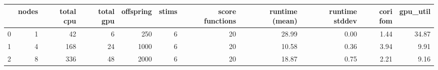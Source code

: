 \begin{tabular}{lrrrrrrrrrr}
\toprule
{} &  nodes &  total cpu &  total gpu &  offspring &  stims &  score functions & runtime (mean) & runtime stddev & cori fom & gpu\_util \\
\midrule
0 &      1 &         42 &          6 &        250 &      6 &               20 &          28.99 &           0.00 &     1.44 &    34.87 \\
1 &      4 &        168 &         24 &       1000 &      6 &               20 &          10.58 &           0.36 &     3.94 &     9.91 \\
2 &      8 &        336 &         48 &       2000 &      6 &               20 &          18.87 &           0.75 &     2.21 &     9.16 \\
\bottomrule
\end{tabular}
